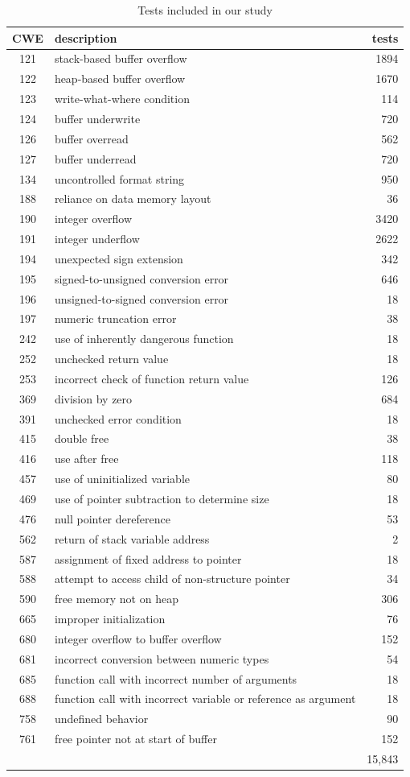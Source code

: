 \documentclass[11pt]{article}
\begin{document}
\begin{table}[h]
\begin{tabular}{c|l|r}
CWE & description & tests \\ \hline
121 & stack-based buffer overflow &  1894  \\
122 & heap-based buffer overflow  &  1670 \\
123 & write-what-where condition & 114 \\
124 & buffer underwrite & 720 \\
126 & buffer overread  & 562 \\
127 & buffer underread &  720 \\
134 & uncontrolled format string & 950 \\
188 & reliance on data memory layout & 36 \\
190 & integer overflow & 3420 \\
191 & integer underflow & 2622 \\
194 & unexpected sign extension & 342 \\
195 & signed-to-unsigned conversion error & 646 \\
196 & unsigned-to-signed conversion error & 18 \\
197 & numeric truncation error & 38 \\
242 & use of inherently dangerous function & 18 \\
252 & unchecked return value & 18 \\
253 & incorrect check of function return value & 126 \\
369 & division by zero & 684 \\
391 & unchecked error condition & 18 \\
415 & double free & 38 \\
416 & use after free & 118 \\
457 & use of uninitialized variable & 80 \\
469 & use of pointer subtraction to determine size & 18 \\
476 & null pointer dereference & 53 \\
562 & return of stack variable address & 2 \\
587 & assignment of fixed address to pointer & 18 \\
588 & attempt to access child of non-structure pointer & 34 \\
590 & free memory not on heap &  306 \\
665 & improper initialization & 76 \\
680 & integer overflow to buffer overflow & 152 \\
681 & incorrect conversion between numeric types & 54 \\
685 & function call with incorrect number of arguments & 18 \\
688 & function call with incorrect variable or reference as argument & 18 \\
758 & undefined behavior & 90 \\
761 & free pointer not at start of buffer & 152 \\ \hline
 & & 15,843
\end{tabular}
\caption{\label{tab:cwes} Tests included in our study}
\end{table}
\end{document}
